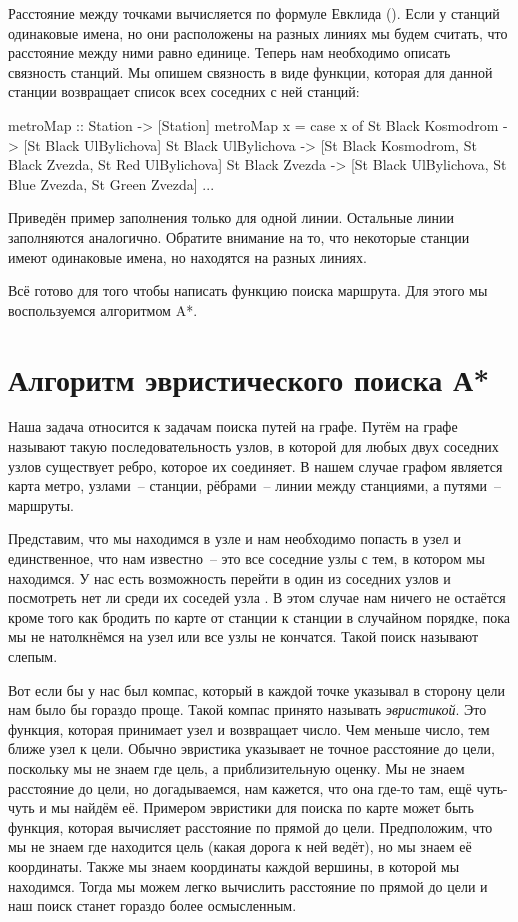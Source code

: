 Расстояние между точками вычисляется по формуле Евклида ().
Если у станций одинаковые имена, но они расположены на
разных линиях мы будем считать, что расстояние между ними равно
единице.
Теперь нам необходимо описать связность станций.
Мы опишем связность в виде функции, которая для данной станции
возвращает список всех соседних с ней станций:

\begin{code}
metroMap :: Station -> [Station]
metroMap x = case x of
    St Black Kosmodrom          -> [St Black UlBylichova]
    St Black UlBylichova        -> 
            [St Black Kosmodrom, St Black Zvezda, St Red UlBylichova]  
    St Black  Zvezda            -> 
            [St Black UlBylichova, St Blue  Zvezda, St Green Zvezda]
    ...
\end{code}

Приведён пример заполнения только для одной линии.
Остальные линии заполняются аналогично. Обратите внимание на то, что
некоторые станции  имеют одинаковые имена, но находятся на разных
линиях.

Всё готово для того чтобы написать функцию поиска
маршрута. Для этого мы воспользуемся алгоритмом A*. 


\section{Алгоритм эвристического поиска А*}

Наша задача относится к задачам поиска путей на графе.
Путём на графе называют такую последовательность узлов,
в которой для любых двух соседних узлов существует ребро, 
которое их соединяет. В нашем случае графом является карта метро,
узлами~-- станции, рёбрами~-- линии между станциями, а
путями~-- маршруты. 

Представим, что мы находимся в узле  и нам необходимо
попасть в узел  и единственное, что нам известно~-- это
все соседние узлы с тем, в котором мы находимся. 
У нас есть возможность перейти в один из соседних узлов и посмотреть
нет ли среди их соседей узла . В этом случае нам ничего не 
остаётся кроме того как бродить по карте от станции к станции 
в случайном порядке, пока мы не натолкнёмся на узел  
или все узлы не кончатся. Такой поиск называют слепым.

Вот если бы у нас был компас, который в каждой точке 
указывал в сторону цели нам было бы гораздо проще. 
Такой компас принято называть \emph{эвристикой}. 
Это функция, которая принимает узел и возвращает 
число. Чем меньше число, тем ближе узел к цели. 
Обычно эвристика указывает не точное расстояние до цели,
поскольку мы не знаем где цель, а приблизительную оценку.
Мы не знаем расстояние до цели, но догадываемся,
нам кажется, что она где-то там, ещё чуть-чуть и
мы найдём её. Примером эвристики для поиска по карте может быть 
функция, которая вычисляет расстояние по прямой до цели.
Предположим, что мы не знаем где находится цель (какая
дорога к ней ведёт), но мы знаем её координаты. Также
мы знаем координаты каждой вершины, в которой мы находимся.
Тогда мы можем легко вычислить расстояние по прямой до
цели и наш поиск станет гораздо более осмысленным.

